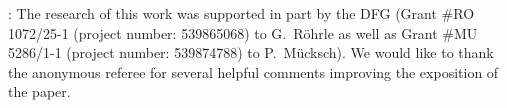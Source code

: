 \documentclass[12pt]{amsart}
\numberwithin{equation}{section}
\theoremstyle{plain}
\theoremstyle{definition}
\begin{document}

\bigskip


: 
The research of this work was supported in part by
the DFG (Grant \#RO 1072/25-1 (project number: 539865068) to G.~R\"ohrle
as well as Grant \#MU 5286/1-1 (project number: 539874788) to P.~Mücksch).
We would like to thank the anonymous referee for several helpful comments improving the exposition of the paper.



\bigskip


\end{document}
